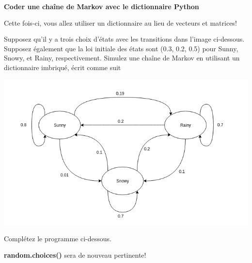 \begin{Exercice}[20 minutes]\textbf{Coder une chaîne de Markov avec le dictionnaire Python}

Cette fois-ci, vous allez utiliser un dictionnaire au lieu de vecteurs et matrices!

Supposez qu'il y a trois choix d'états avec les transitions dans l'image ci-dessous. Supposez également que la loi initiale des états sont (0.3, 0.2, 0.5) pour Sunny, Snowy, et Rainy, respectivement. Simulez une chaîne de Markov en utilisant un dictionnaire imbriqué, écrit comme suit

\begin{center}
        \includegraphics[width=\linewidth]{Etats_markov.png}
\end{center}
    
Complétez le programme ci-dessous.


\begin{conseil}
    \textbf{random.choices()} sera de nouveau pertinente!
\end{conseil}
\begin{solution}
    
\end{solution}
\end{Exercice}



